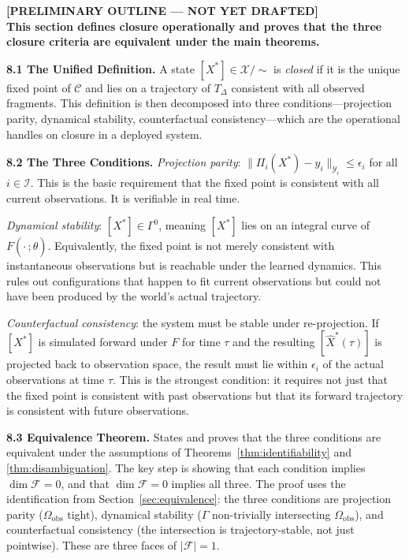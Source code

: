 \documentclass[12pt, oneside]{article}
\newcommand{\preliminary}[1]{%
  \colorbox{yellow!20}{\parbox{\dimexpr\linewidth-2\fboxsep}{%
    \textbf{\textcolor{red!70!black}{[PRELIMINARY OUTLINE --- NOT YET DRAFTED]}}\\[4pt]
    #1
  }}%
}
\newcommand{\Xmod}{\mathcal{X}/{\sim}}
\begin{document}
\preliminary{
\textbf{This section defines closure operationally and proves that the three closure
criteria are equivalent under the main theorems.}

\medskip
\textbf{8.1 The Unified Definition.}
A state $[X^*] \in \Xmod$ is \emph{closed} if it is the unique fixed point of
$\mathcal{C}$ and lies on a trajectory of $T_\Delta$ consistent with all observed
fragments. This definition is then decomposed into three conditions---projection parity,
dynamical stability, counterfactual consistency---which are the operational handles on
closure in a deployed system.

\medskip
\textbf{8.2 The Three Conditions.}
\textit{Projection parity}: $\|\Pi_i(X^*) - y_i\|_{\mathcal{Y}_i} \le \epsilon_i$ for all
$i \in \mathcal{I}$. This is the basic requirement that the fixed point is consistent with
all current observations. It is verifiable in real time.

\textit{Dynamical stability}: $[X^*] \in \Gamma^0$, meaning $[X^*]$ lies on an integral
curve of $F(\cdot\,;\hat{\theta})$. Equivalently, the fixed point is not merely consistent
with instantaneous observations but is reachable under the learned dynamics. This rules
out configurations that happen to fit current observations but could not have been produced
by the world's actual trajectory.

\textit{Counterfactual consistency}: the system must be stable under re-projection. If
$[X^*]$ is simulated forward under $F$ for time $\tau$ and the resulting
$[\hat{X}^*(\tau)]$ is projected back to observation space, the result must lie within
$\epsilon_i$ of the actual observations at time $\tau$. This is the strongest condition:
it requires not just that the fixed point is consistent with past observations but that
its forward trajectory is consistent with future observations.

\medskip
\textbf{8.3 Equivalence Theorem.}
States and proves that the three conditions are equivalent under the assumptions of
Theorems~\ref{thm:identifiability} and \ref{thm:disambiguation}. The key step is showing
that each condition implies $\dim \mathcal{F} = 0$, and that $\dim \mathcal{F} = 0$
implies all three. The proof uses the identification from Section~\ref{sec:equivalence}:
the three conditions are projection parity ($\Omega_{\mathrm{obs}}$ tight), dynamical
stability ($\Gamma$ non-trivially intersecting $\Omega_{\mathrm{obs}}$), and counterfactual
consistency (the intersection is trajectory-stable, not just pointwise). These are three
faces of $|\mathcal{F}| = 1$.

}
\end{document}
